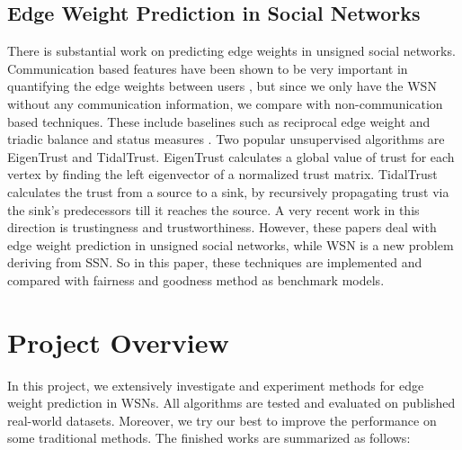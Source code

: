 \documentclass{article}
\begin{document}
\subsection{Edge Weight Prediction in Social Networks}
There is substantial work on predicting edge weights in unsigned social 
networks. Communication based features have been shown to be 
very important in quantifying the edge weights between 
users\cite{Gilbert:2012:PTS:2145204.2145360}\cite{Gilbert:2009:PTS:1518701.1518736}
\cite{Xiang:2010:MRS:1772690.1772790}\cite{Kahanda2009}, but 
since we only have the WSN without any communication information, 
we compare with non-communication based techniques. These 
include baselines such as reciprocal edge weight\cite{Gilbert:2012:PTS:2145204.2145360} 
and triadic balance and status measures\cite{Gilbert:2009:PTS:1518701.1518736}
\cite{Sintos:2014:UST:2623330.2623664}. Two popular unsupervised 
algorithms are EigenTrust\cite{Kamvar:2003:EAR:775152.775242} 
and TidalTrust\cite{Katz2006}. EigenTrust calculates a global 
value of trust for each vertex by finding the left eigenvector 
of a normalized trust matrix. TidalTrust calculates the trust 
from a source to a sink, by recursively propagating trust via 
the sink’s predecessors till it reaches the source. A very 
recent work in this direction is trustingness and 
trustworthiness\cite{Roy2016}. However, these papers deal with 
edge weight prediction in unsigned social networks, while WSN 
is a new problem deriving from SSN. So in this paper, these 
techniques are implemented and compared with fairness and goodness 
method as benchmark models.

\section{Project Overview}
\label{sec3}
In this project, we extensively investigate and experiment methods for edge weight prediction in WSNs. All algorithms are tested and evaluated on published real-world datasets. Moreover, we try our best to improve the performance on some traditional methods. The finished works are summarized as follows:
\end{document}
